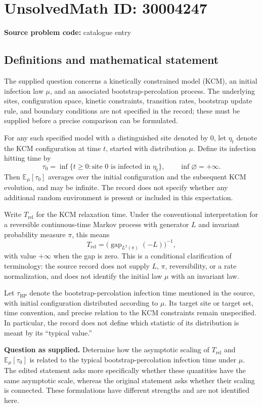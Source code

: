 \documentclass[11pt]{article}
\begin{document}
\section*{UnsolvedMath ID: 30004247}
\textbf{Source problem code:} catalogue entry
\subsection{Definitions and mathematical statement}
The supplied question concerns a kinetically constrained model (KCM), an initial infection law \(\mu\), and an associated bootstrap-percolation process. The underlying sites, configuration space, kinetic constraints, transition rates, bootstrap update rule, and boundary conditions are not specified in the record; these must be supplied before a precise comparison can be formulated.

For any such specified model with a distinguished site denoted by \(0\), let \(\eta_t\) denote the KCM configuration at time \(t\), started with distribution \(\mu\). Define its infection hitting time by
\[
\tau_0=\inf\{t\geq 0: \text{site }0\text{ is infected in }\eta_t\},
\qquad \inf\varnothing=+\infty.
\]
Then \(\mathbb E_\mu[\tau_0]\) averages over the initial configuration and the subsequent KCM evolution, and may be infinite. The record does not specify whether any additional random environment is present or included in this expectation.

Write \(T_{\mathrm{rel}}\) for the KCM relaxation time. Under the conventional interpretation for a reversible continuous-time Markov process with generator \(L\) and invariant probability measure \(\pi\), this means
\[
T_{\mathrm{rel}}=\bigl(\operatorname{gap}_{L^2(\pi)}(-L)\bigr)^{-1},
\]
with value \(+\infty\) when the gap is zero. This is a conditional clarification of terminology: the source record does not supply \(L\), \(\pi\), reversibility, or a rate normalization, and does not identify the initial law \(\mu\) with an invariant law.

Let \(\tau_{\mathrm{BP}}\) denote the bootstrap-percolation infection time mentioned in the source, with initial configuration distributed according to \(\mu\). Its target site or target set, time convention, and precise relation to the KCM constraints remain unspecified. In particular, the record does not define which statistic of its distribution is meant by its ``typical value.''

\textbf{Question as supplied.} Determine how the asymptotic scaling of \(T_{\mathrm{rel}}\) and \(\mathbb E_\mu[\tau_0]\) is related to the typical bootstrap-percolation infection time under \(\mu\). The edited statement asks more specifically whether these quantities have the same asymptotic scale, whereas the original statement asks whether their scaling is connected. These formulations have different strengths and are not identified here.
\end{document}
